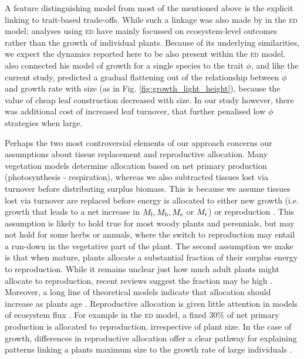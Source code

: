 \documentclass[a4paper,11pt]{article}
\begin{document}
A feature distinguishing model from most of the mentioned above is the explicit linking to trait-based trade-offs. While such a linkage was also made by \citet{Moorcroft-2001} in the \textsc{ed} model; analyses using \textsc{ed} have mainly focussed on ecosystem-level outcomes rather than the growth of individual plants. Because of its underlying similarities, we expect the dynamics reported here to be also present within the \textsc{ed} model. \citet{King-1999} also connected his model of growth for a single species to the trait $\phi$, and like the current study, predicted a gradual flattening out of the relationship between $\phi$ and growth rate with size (as in Fig. \ref{fig:growth_light_height}), because the value of cheap leaf construction decreased with size. In our study however, there was additional cost of increased leaf turnover, that further penalised low $\phi$ strategies when large.

Perhaps the two most controversial elements of our approach concerns our assumptions about tissue replacement and reproductive allocation. Many vegetation models determine allocation based on net primary production (photosynthesis - respiration), whereas we also subtracted tissues lost via turnover before distributing surplus biomass. This is because we assume tissues lost via turnover are replaced before energy is allocated to either new growth (i.e. growth that leads to a net increase in $M_{\rm l}, M_{\rm b}, M_{\rm s}$ or $M_{\rm r}$) or reproduction \citep{Thornley-2000}. This assumption is likely to hold true for most woody plants and perennials, but may not hold for some herbs or annuals, where the switch to reproduction may entail a run-down in the vegetative part of the plant. The second assumption we make is that when mature, plants allocate a substantial fraction of their surplus energy to reproduction. While it remains unclear just how much adult plants might allocate to reproduction, recent reviews suggest the fraction may be high \citep{Thomas-2011, Wenk-2015}. Moreover, a long line of theoretical models indicate that allocation should increase as plants age \citep[reviewed by ][]{Wenk-2015}. Reproductive allocation is given little attention in models of ecosystem flux \citep[e.g.][]{Sitch-2008, DeKauwe-2014}. For example in the \textsc{ed} model, a fixed 30\% of net primary production is allocated to reproduction, irrespective of plant size. In the case of growth, differences in reproductive allocation offer a clear pathway for explaining patterns linking a plants maximum size to the growth rate of large individuals \citep[e.g.][]{Wright-2010}.
\end{document}
